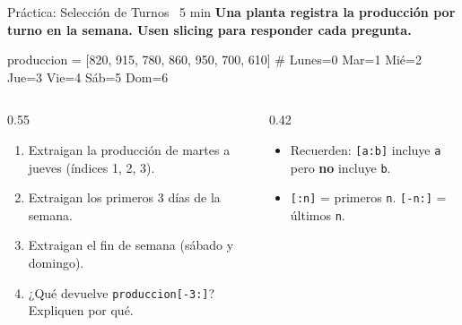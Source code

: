\documentclass[aspectratio=169, 11pt]{beamer}
\begin{document}
\begin{frame}[fragile,shrink=25]{Práctica: Selección de Turnos \hfill
    {\normalsize\color{arcaRed}\faClock\ 5 min}}
  \vspace{-6pt}
  {\small\color{arcaDark}\bfseries
    Una planta registra la producción por turno en la semana.
    Usen slicing para responder cada pregunta.}

  \vspace{4pt}
  \begin{pyblock}
produccion = [820, 915, 780, 860, 950, 700, 610]
# Lunes=0  Mar=1  Mié=2  Jue=3  Vie=4  Sáb=5  Dom=6
  \end{pyblock}

  \vspace{6pt}
  \begin{columns}[T]
    \begin{column}{0.55\textwidth}
      {\footnotesize
      \begin{enumerate}\setlength{\itemsep}{6pt}
        \item Extraigan la producción de martes a jueves
              (índices 1, 2, 3).
        \item Extraigan los primeros 3 días de la semana.
        \item Extraigan el fin de semana (sábado y domingo).
        \item ¿Qué devuelve \texttt{produccion[-3:]}?
              Expliquen por qué.
      \end{enumerate}
      }
    \end{column}

    \begin{column}{0.42\textwidth}
      {\footnotesize\color{textMuted}
      \begin{itemize}\setlength{\itemsep}{4pt}
        \item[{\color{arcaRed}\scriptsize\faLightbulb}]
          Recuerden: \texttt{[a:b]} incluye \texttt{a}
          pero \textbf{no} incluye \texttt{b}.
        \item[{\color{arcaRed}\scriptsize\faLightbulb}]
          \texttt{[:n]} = primeros \texttt{n}.
          \texttt{[-n:]} = últimos \texttt{n}.
      \end{itemize}
      }
    \end{column}
  \end{columns}
\end{frame}
\end{document}
